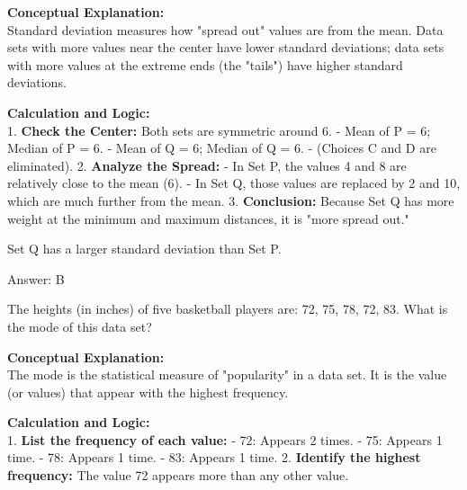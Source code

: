\documentclass[11pt,paper=a4,answers]{exam}
\begin{document}
\begin{questions}
\begin{solution}
\textbf{Conceptual Explanation:} \\
Standard deviation measures how "spread out" values are from the mean. Data sets with more values near the center have lower standard deviations; data sets with more values at the extreme ends (the "tails") have higher standard deviations.

\vspace{30pt}

\textbf{Calculation and Logic:} \\
1. \textbf{Check the Center:} Both sets are symmetric around 6. 
   - Mean of P = 6; Median of P = 6.
   - Mean of Q = 6; Median of Q = 6. 
   - (Choices C and D are eliminated).
2. \textbf{Analyze the Spread:} 
   - In Set P, the values 4 and 8 are relatively close to the mean (6).
   - In Set Q, those values are replaced by 2 and 10, which are much further from the mean.
3. \textbf{Conclusion:} Because Set Q has more weight at the minimum and maximum distances, it is "more spread out."

\vspace{20pt}

Set Q has a larger standard deviation than Set P.

\vspace{30pt}

Answer: \colorbox{yellow!100}{B}
\end{solution}

\vspace{60pt}

\question
The heights (in inches) of five basketball players are: 72, 75, 78, 72, 83. What is the mode of this data set?

\begin{solution}
\textbf{Conceptual Explanation:} \\
The mode is the statistical measure of "popularity" in a data set. It is the value (or values) that appear with the highest frequency.

\vspace{30pt}

\textbf{Calculation and Logic:} \\
1. \textbf{List the frequency of each value:}
   - 72: Appears 2 times.
   - 75: Appears 1 time.
   - 78: Appears 1 time.
   - 83: Appears 1 time.
2. \textbf{Identify the highest frequency:} The value 72 appears more than any other value.


\end{solution}
\end{questions}
\end{document}
